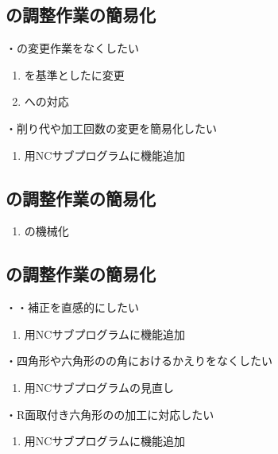 \subsection{\EndFacecutMilling の調整作業の簡易化}
・\TDCorrection の変更作業をなくしたい
\begin{enumerate}[label=\sarrow]
\item \IDCenter を基準とした\EndFacecutMilling に変更
\item \ODCornerR への対応
\end{enumerate}
・削り代や加工回数の変更を簡易化したい
\begin{enumerate}[label=\sarrow]
\item \EndFacecutMilling 用NCサブプログラムに機能追加
\end{enumerate}


\subsection{\OutcutMilling の調整作業の簡易化}
\begin{enumerate}[label=\sarrow]
\item \CurvedOutcutMilling の機械化
\end{enumerate}


\subsection{\KeywayMilling の調整作業の簡易化}
・\KeywayPos・\KeywayWidth 補正を直感的にしたい
\begin{enumerate}[label=\sarrow]
\item \KeywayMilling 用NCサブプログラムに機能追加
\end{enumerate}
・四角形や六角形の\Keyway の角におけるかえりをなくしたい
\begin{enumerate}[label=\sarrow]
\item \KeywayMilling 用NCサブプログラムの見直し
\end{enumerate}
・R面取付き六角形の\Keyway の加工に対応したい
\begin{enumerate}[label=\sarrow]
\item \KeywayMilling 用NCサブプログラムに機能追加
\end{enumerate}


